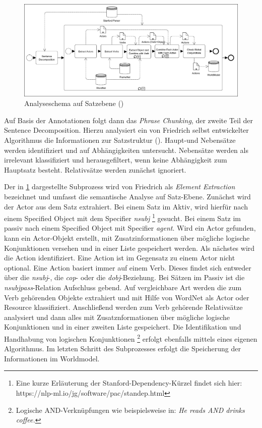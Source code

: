 \begin{figure}[H]
\begin{center}
\includegraphics[keepaspectratio=true, width=\textwidth]{pictures/SentenceLevel.png}
\caption{Analyseschema auf Satzebene (\cite[vgl.][5]{FRIEDRICH2})}
\label{fig:SLEVEL}
\end{center}\end{figure}
Auf Basis der Annotationen folgt dann das \textit{Phrase Chunking}, der zweite Teil der Sentence Decomposition. Hierzu analysiert ein von Friedrich selbst entwickelter Algorithmus die Informationen zur Satzstruktur (\cite[vgl.][49]{FRIEDRICH2}). Haupt-und Nebensätze werden identifiziert und  auf Abhängigkeiten untersucht. Nebensätze werden als irrelevant klassifiziert und herausgefiltert, wenn keine Abhängigkeit zum Hauptsatz besteht. Relativsätze werden zunächst ignoriert.
\par
Der in \ref{fig:SLEVEL} dargestellte Subprozess wird von Friedrich als \textit{Element Extraction} bezeichnet und umfasst die semantische Analyse auf Satz-Ebene. Zunächst wird der Actor aus dem Satz extrahiert. Bei einem Satz im Aktiv, wird hierfür nach einem Specified Object mit dem Specifier \textit{nsubj} \footnote{Eine kurze Erläuterung der Stanford-Dependency-Kürzel findet sich hier: https://nlp-ml.io/jg/software/pac/standep.html} gesucht. Bei einem Satz im passiv nach einem Specified Object mit Specifier \textit{agent}. Wird ein Actor gefunden, kann ein Actor-Objekt erstellt, mit Zusatzinformationen über mögliche logische Konjunktionen versehen und in einer Liste gespeichert werden. Als nächstes wird die Action identifiziert.  Eine Action ist im Gegensatz zu einem Actor nicht optional. Eine Action basiert immer auf einem Verb. Dieses findet sich entweder über die \textit{nsubj}-, die \textit{cop}- oder die \textit{dobj}-Beziehung. Bei Sätzen im Passiv ist die \textit{nsubjpass}-Relation Aufschluss gebend. Auf vergleichbare Art werden die zum Verb gehörenden Objekte extrahiert und mit Hilfe von WordNet als Actor oder Resource klassifiziert. Anschließend werden zum Verb gehörende Relativsätze analysiert und dann alles mit Zusatznformationen über mögliche logische Konjunktionen und in einer zweiten Liste gespeichert. Die Identifikation und Handhabung von logischen Konjunktionen \footnote{Logische AND-Verknüpfungen wie beispielsweise in: \textit{He reads AND drinks coffee.}} erfolgt ebenfalls mittels eines eigenen Algorithmus. Im letzten Schritt des Subprozesses erfolgt die Speicherung der Informationen im Worldmodel.
